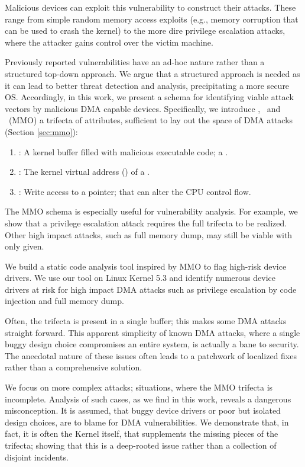 Malicious devices can exploit this vulnerability to construct their attacks. These range from simple random memory access exploits (e.g., memory corruption that can be used to crash the kernel) to the more dire privilege escalation attacks, where the attacker gains control over the victim machine.

Previously reported vulnerabilities have an ad-hoc nature \cite{thunder,MMT16,Ben17b} rather than a structured top-down approach. We argue that a structured approach is needed as it can lead to better threat detection and analysis, precipitating a more secure OS. Accordingly, in this work, we present a schema for identifying viable attack vectors by malicious DMA capable devices. Specifically, we introduce \means,~\motivation{} and \oportunity~(MMO) a trifecta of attributes, sufficient to lay out the space of DMA attacks (Section \ref{sec:mmo}):
\begin{enumerate}
    \item \motivation: A kernel buffer filled with malicious executable code; a \mabaf.
    \item \means: The kernel virtual address (\kva) of a \mabaf.
    \item \oportunity: Write access to a pointer; that can alter the CPU control flow.
\end{enumerate} 

The MMO schema is especially useful for vulnerability analysis. For example, we show that a privilege escalation attack requires the full trifecta to be realized. Other high impact attacks, such as full memory dump, may still be viable with only \oportunity{} given. 

We build a static code analysis tool inspired by MMO to flag high-risk device drivers. We use our tool on Linux Kernel 5.3 and identify numerous device drivers at risk for high impact DMA attacks such as privilege escalation by code injection and full memory dump. 

Often, the trifecta is present in a single buffer; this makes some DMA attacks straight forward. This apparent simplicity of known DMA attacks, where a single buggy design choice compromises an entire system, is actually a bane to security. The anecdotal nature of these issues often leads to a patchwork of localized fixes rather than a comprehensive solution. 

We focus on more complex attacks; situations, where the MMO trifecta is incomplete. Analysis of such cases, as we find in this work, reveals a dangerous misconception. It is assumed, that buggy device drivers or poor but isolated design choices, are to blame for DMA vulnerabilities. We demonstrate that, in fact, it is often the Kernel itself, that supplements the missing pieces of the trifecta; showing that this is a deep-rooted issue rather than a collection of disjoint incidents.

